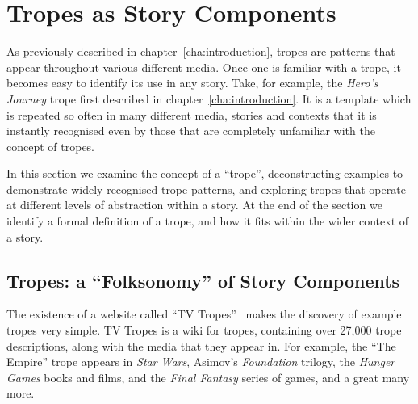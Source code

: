 \chapter{Tropes as Story Components}
\label{cha:tropes}
As previously described in chapter~\ref{cha:introduction}, tropes are
patterns that appear throughout various different media. Once one is familiar
with a trope, it becomes easy to identify its use in any story. Take, for
example, the \emph{Hero's Journey} trope first described in
chapter~\ref{cha:introduction}. It is a template which is repeated so often in
many different media, stories and contexts that it is instantly recognised even
by those that are completely unfamiliar with the concept of tropes.


In this section we examine the concept of a ``trope'', deconstructing examples
to demonstrate widely-recognised trope patterns, and exploring tropes that
operate at different levels of abstraction within a story. At the end of the
section we identify a formal definition of a trope, and how it fits within the
wider context of a story.

\section{Tropes: a ``Folksonomy'' of Story Components}
The existence of a website called ``TV Tropes''~\citep{tvtropes} makes the discovery of example
tropes very simple. TV Tropes is a wiki for tropes, containing over 27,000
trope descriptions, along with the media that they appear in. For example, the
``The Empire'' trope appears in \emph{Star Wars}, Asimov's \emph{Foundation}
trilogy, the \emph{Hunger Games} books and films, and the \emph{Final Fantasy}
series of games, and a great many more.



